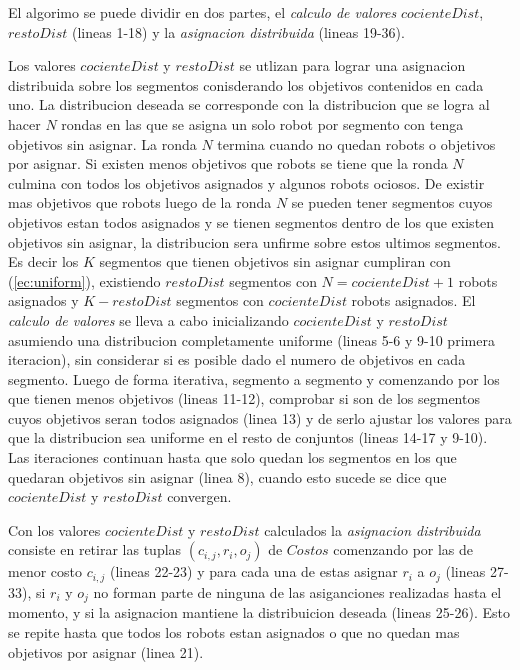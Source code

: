 El algorimo se puede dividir en dos partes, el \emph{calculo de valores}
$cocienteDist$, $restoDist$ (lineas 1-18) y la \emph{asignacion distribuida} (lineas
19-36). 

Los valores $cocienteDist$ y $restoDist$ se utlizan para lograr una asignacion
distribuida sobre los segmentos conisderando los objetivos contenidos en cada
uno. La distribucion deseada se corresponde con la distribucion que se logra al
hacer $N$ rondas en las que se asigna un solo robot por segmento con tenga
objetivos sin asignar. La ronda $N$ termina cuando no quedan robots o objetivos
por asignar. Si existen menos objetivos que robots se tiene que la ronda $N$
culmina con todos los objetivos asignados y algunos robots ociosos. De existir
mas objetivos que robots luego de la ronda $N$ se pueden tener segmentos cuyos
objetivos estan todos asignados y se tienen segmentos dentro de los que 
existen objetivos sin asignar, la distribucion sera unfirme sobre estos ultimos
segmentos. Es decir los $K$ segmentos que tienen objetivos sin asignar
cumpliran con (\ref{ec:uniform}), existiendo $restoDist$ segmentos con
$N=cocienteDist+1$ robots asignados y $K-restoDist$ segmentos con
$cocienteDist$ robots asignados. El \emph{calculo de valores} se lleva a cabo
inicializando $cocienteDist$ y $restoDist$ asumiendo una distribucion
completamente uniforme (lineas 5-6 y 9-10 primera iteracion), sin considerar si
es posible dado el numero de objetivos en cada segmento. Luego de forma
iterativa, segmento a segmento y comenzando por los que tienen menos objetivos
(lineas 11-12), comprobar si son de los segmentos cuyos objetivos seran todos
asignados (linea 13) y de serlo ajustar los valores para que la distribucion
sea uniforme en el resto de conjuntos (lineas 14-17 y 9-10). Las iteraciones
continuan hasta que solo quedan los segmentos en los que quedaran objetivos sin
asignar (linea 8), cuando esto sucede se dice que $cocienteDist$ y $restoDist$
convergen.

Con los valores $cocienteDist$ y $restoDist$ calculados la \emph{asignacion
distribuida} consiste en retirar las tuplas $(c_{i,j},r_i,o_j)$ de $Costos$
comenzando por las de menor costo $c_{i,j}$ (lineas 22-23) y para cada una de
estas asignar $r_i$ a $o_j$ (lineas 27-33), si $r_i$ y $o_j$ no forman parte de
ninguna de las asiganciones realizadas hasta el momento, y si la asignacion
mantiene la distribuicion deseada (lineas 25-26). Esto se repite hasta que
todos los robots estan asignados o que no quedan mas objetivos por asignar
(linea 21).

